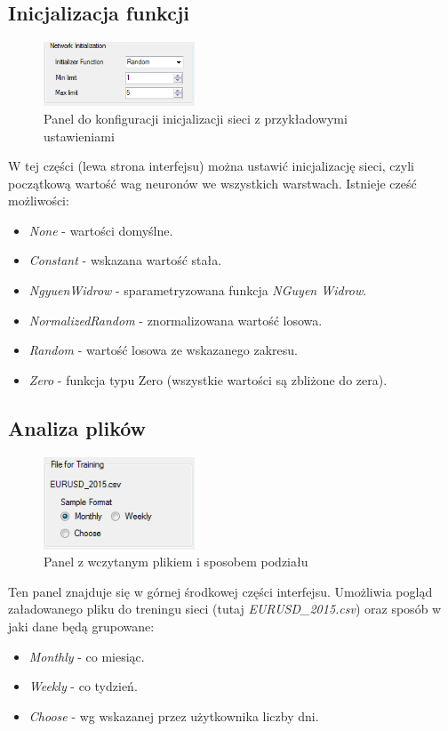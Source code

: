 \documentclass[a4paper]{article}
\begin{document}
			\subsection{Inicjalizacja funkcji}
				\begin{figure}[h!]
					\centering
					\includegraphics[width=0.40\textwidth]{./img/GUI_network_initialization}
					\caption{Panel do konfiguracji inicjalizacji sieci z przykładowymi ustawieniami}
				\end{figure}
				W tej części (lewa strona interfejsu) można ustawić inicjalizację sieci, czyli początkową wartość wag neuronów we wszystkich warstwach. Istnieje cześć możliwości:
				\begin{itemize}
					\item \emph{None} - wartości domyślne.
					\item \emph{Constant} - wskazana wartość stała.
					\item \emph{NgyuenWidrow} - sparametryzowana funkcja\textit{ NGuyen Widrow}.
					\item \emph{NormalizedRandom} - znormalizowana wartość losowa.
					\item \emph{Random} - wartość losowa ze wskazanego zakresu.
					\item \emph{Zero} - funkcja typu Zero (wszystkie wartości są zbliżone do zera).
				\end{itemize}
			\newpage
			\subsection{Analiza plików}
				\begin{figure}[h!]
					\centering
					\includegraphics[width=0.40\textwidth]{./img/GUI_files}
					\caption{Panel z wczytanym plikiem i sposobem podziału}
				\end{figure}
				Ten panel znajduje się w górnej środkowej części interfejsu. Umożliwia pogląd załadowanego pliku do treningu sieci (tutaj \textit{EURUSD\_2015.csv}) oraz sposób w jaki dane będą grupowane:
				\begin{itemize}
					\item \emph{Monthly} - co miesiąc.
					\item \emph{Weekly} - co tydzień.
					\item \emph{Choose} - wg wskazanej przez użytkownika liczby dni.
				\end{itemize}
\end{document}
